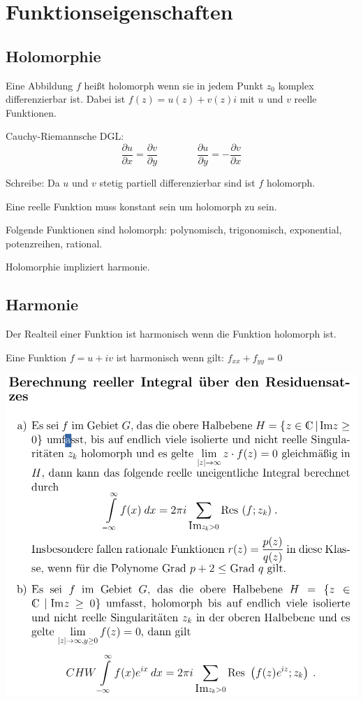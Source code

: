 \documentclass[10pt,a4paper]{article}
\begin{document}
\section{Funktionseigenschaften}
\subsection{Holomorphie}
Eine Abbildung $f$ heißt holomorph wenn sie in jedem Punkt $z_0$ komplex differenzierbar ist. Dabei ist $f(z) = u(z) + v(z)i$ mit $u$ und $v$ reelle Funktionen.

Cauchy-Riemannsche DGL:
\[
\frac{\partial u}{\partial x} = \frac{\partial v}{\partial y}
\,\,\,\,\,\,\,\,\,\,\,\,\,\,\,\,\,\,\,\,\,\,\,\,
\frac{\partial u}{\partial y} = - \frac{\partial v}{\partial x}
\]

Schreibe: Da $u$ und $v$ stetig partiell differenzierbar sind ist $f$ holomorph.

Eine reelle Funktion muss konstant sein um holomorph zu sein.

Folgende Funktionen sind holomorph: polynomisch, trigonomisch, exponential, potenzreihen, rational.

Holomorphie impliziert harmonie.

\subsection{Harmonie}
Der Realteil einer Funktion ist harmonisch wenn die Funktion holomorph ist.

Eine Funktion $f=u + iv$ ist harmonisch wenn gilt: $f_{xx} + f_{yy} = 0$

\includegraphics[scale=0.3]{kalk1}
\end{document}

